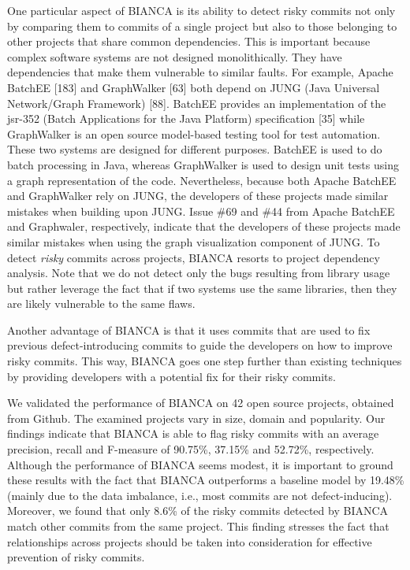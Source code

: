\documentclass[12pt]{report}
\begin{document}
One particular aspect of BIANCA is its ability to detect risky commits
not only by comparing them to commits of a single project but also to
those belonging to other projects that share common dependencies. This
is important because complex software systems are not designed
monolithically. They have dependencies that make them vulnerable to
similar faults. For example, Apache BatchEE {[}183{]} and GraphWalker
{[}63{]} both depend on JUNG (Java Universal Network/Graph Framework)
{[}88{]}. BatchEE provides an implementation of the jsr-352 (Batch
Applications for the Java Platform) specification {[}35{]} while
GraphWalker is an open source model-based testing tool for test
automation. These two systems are designed for different purposes.
BatchEE is used to do batch processing in Java, whereas GraphWalker is
used to design unit tests using a graph representation of the code.
Nevertheless, because both Apache BatchEE and GraphWalker rely on JUNG,
the developers of these projects made similar mistakes when building
upon JUNG. Issue \#69 and \#44 from Apache BatchEE and Graphwaler,
respectively, indicate that the developers of these projects made
similar mistakes when using the graph visualization component of JUNG.
To detect \emph{risky} commits across projects, BIANCA resorts to
project dependency analysis. Note that we do not detect only the bugs
resulting from library usage but rather leverage the fact that if two
systems use the same libraries, then they are likely vulnerable to the
same flaws.

Another advantage of BIANCA is that it uses commits that are used to fix
previous defect-introducing commits to guide the developers on how to
improve risky commits. This way, BIANCA goes one step further than
existing techniques by providing developers with a potential fix for
their risky commits.

We validated the performance of BIANCA on 42 open source projects,
obtained from Github. The examined projects vary in size, domain and
popularity. Our findings indicate that BIANCA is able to flag risky
commits with an average precision, recall and F-measure of 90.75\%,
37.15\% and 52.72\%, respectively. Although the performance of BIANCA
seems modest, it is important to ground these results with the fact that
BIANCA outperforms a baseline model by 19.48\% (mainly due to the data
imbalance, i.e., most commits are not defect-inducing). Moreover, we
found that only 8.6\% of the risky commits detected by BIANCA match
other commits from the same project. This finding stresses the fact that
relationships across projects should be taken into consideration for
effective prevention of risky commits.
\end{document}
